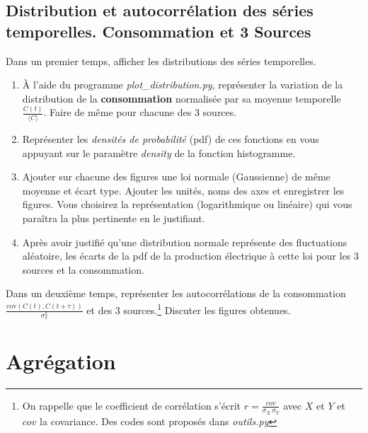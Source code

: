 \documentclass[12pt,a4,french]{article}
\newcommand{\tmtextbf}[1]{{\bfseries{#1}}}
\newcommand{\tmtextit}[1]{{\itshape{#1}}}
\begin{document}
\subsection{Distribution et autocorrélation des séries temporelles. Consommation et 3 Sources}
Dans un premier temps, afficher les distributions des séries temporelles.
\begin{enumerate}
  \item À l'aide du programme \tmtextit{plot\_distribution.py}, représenter
  la variation de la distribution de la \tmtextbf{consommation} normalisée
  par sa moyenne temporelle $\frac{C (t)}{\langle C \rangle}$. Faire de même pour chacune des 3 sources.
  \item  Représenter les \tmtextit{densités de probabilité}
  (pdf) de ces fonctions en vous appuyant sur le paramètre \tmtextit{density}
  de la fonction histogramme. 
  \item Ajouter sur chacune des figures une loi normale (Gaussienne) de même moyenne et écart type. Ajouter les unités,  noms des axes et enregistrer les figures. Vous choisirez la représentation (logarithmique ou linéaire) qui vous paraîtra la plus pertinente en le justifiant.
  \item Après avoir justifié qu'une distribution normale représente des
  fluctuations aléatoire, les écarts de la pdf de la production électrique à cette loi pour les 3 sources et la consommation.
\end{enumerate}

Dans un deuxième temps, représenter les autocorrélations de la consommation $\frac{\text{cov}(C(t),C(t+\tau)) }{\sigma^2_x}$ et des 3 sources.\footnote{On rappelle que le coefficient de corrélation s'écrit $r=\frac{cov}{\sigma_X \, \sigma_Y}$ avec $X$ et $Y$ et $cov$ la covariance. Des codes sont proposés dans \textit{outils.py}} Discuter les figures obtenues.

\section{Agrégation}
\end{document}
